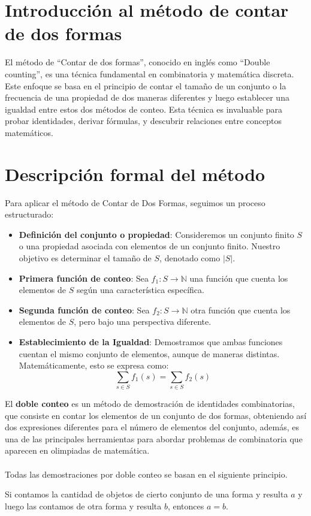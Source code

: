 \section{Introducción al método de contar de dos formas}
El método de ``Contar de dos formas'', conocido en inglés como ``Double counting'', es una técnica fundamental en combinatoria y matemática discreta. Este enfoque se basa en el principio de contar el tamaño de un conjunto o la frecuencia de una propiedad de dos maneras diferentes y luego establecer una igualdad entre estos dos métodos de conteo. Esta técnica es invaluable para probar identidades, derivar fórmulas, y descubrir relaciones entre conceptos matemáticos.

\section{Descripción formal del método}
Para aplicar el método de Contar de Dos Formas, seguimos un proceso estructurado:
\begin{itemize}
    \item \textbf{Definición del conjunto o propiedad}: Consideremos un conjunto finito \( S \) o una propiedad asociada con elementos de un conjunto finito. Nuestro objetivo es determinar el tamaño de \( S \), denotado como \( |S| \).
    \item \textbf{Primera función de conteo}: Sea \( f_1: S \to \mathbb{N} \) una función que cuenta los elementos de \( S \) según una característica específica.
    \item \textbf{Segunda función de conteo}: Sea \( f_2: S \to \mathbb{N} \) otra función que cuenta los elementos de \( S \), pero bajo una perspectiva diferente.
    \item \textbf{Establecimiento de la Igualdad}: Demostramos que ambas funciones cuentan el mismo conjunto de elementos, aunque de maneras distintas. Matemáticamente, esto se expresa como:
    \[ \sum_{s \in S} f_1(s) = \sum_{s \in S} f_2(s) \]
\end{itemize}

El \textbf{doble conteo} es un método de demostración de identidades combinatorias, que consiste en contar los elementos de un conjunto de dos formas, obteniendo así dos expresiones diferentes para el número de elementos del conjunto, además, es una de las principales herramientas para abordar problemas de combinatoria que aparecen en olimpiadas de matemática.\\\\
Todas las demostraciones por doble conteo se basan en el siguiente principio.
\begin{definicion}
Si contamos la cantidad de objetos de cierto conjunto de una forma y resulta $a$ y luego las contamos de otra forma y resulta $b$, entonces $a = b$.
\end{definicion}

